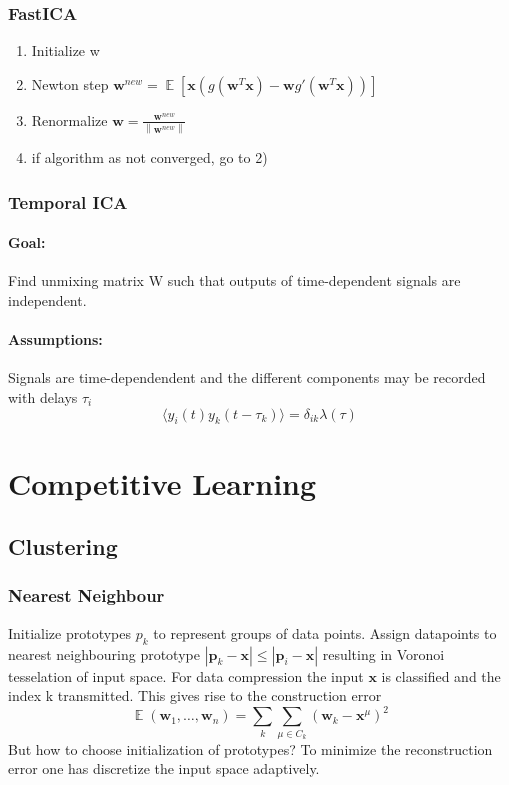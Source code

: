 \documentclass[11pt]{article}
\DeclareMathOperator{\E}{\mathbb{E}}
\newcommand\abs[1]{\left|#1\right|}
\newcommand{\vectornorm}[1]{\left\|#1\right\|}
\begin{document}
\subsubsection{FastICA}
\begin{enumerate}
\item Initialize w
\item Newton step $\mathbf{w}^{new}=\E \left[\mathbf{x}(g(\mathbf{w}^T\mathbf{x})-\mathbf{w}g'(\mathbf{w}^T\mathbf{x}))\right]$
\item Renormalize $\mathbf{w}=\frac{\mathbf{w}^{new}}{\vectornorm{\mathbf{w}^{new}}}$
\item if algorithm as not converged, go to 2)
\end{enumerate}
\subsubsection{Temporal ICA}
\paragraph{Goal:} Find unmixing matrix W such that outputs of time-dependent signals are independent. 
\paragraph{Assumptions:} Signals are time-dependendent and the different components may be recorded with delays $\tau_i$
\[
	\langle y_i(t)y_k(t-\tau_k) \rangle = \delta_{ik}\lambda(\tau)
\]
\section{Competitive Learning}

\subsection{Clustering}
\subsubsection{Nearest Neighbour}
Initialize prototypes $p_k$ to represent groups of data points. Assign datapoints to nearest neighbouring prototype $\abs{\mathbf{p}_k-\mathbf{x}}\leq\abs{\mathbf{p}_i-\mathbf{x}}$ resulting in Voronoi tesselation of input space. For data compression the input $\mathbf{x}$ is classified and the index k transmitted. This gives rise to the construction error
\[
\E(\mathbf{w}_1, \dots, \mathbf{w}_n) = \sum_k \sum_{\mu \in C_k} (\mathbf{w}_k-\mathbf{x}^\mu)^2
\]
But how to choose initialization of prototypes? To minimize the reconstruction error one has discretize the input space adaptively.
\end{document}
